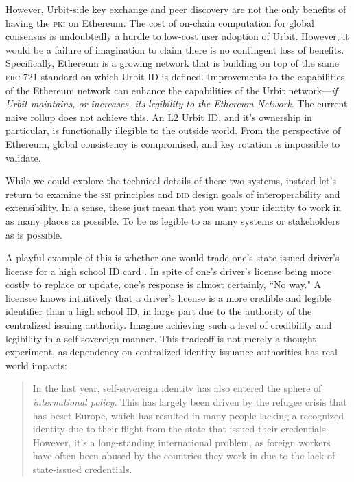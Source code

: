 \documentclass[twoside]{article}
\begin{document}
However, Urbit-side key exchange and peer discovery are not the only benefits of having the \textsc{pki} on Ethereum. The cost of on-chain computation for global consensus is undoubtedly a hurdle to low-cost user adoption of Urbit. However, it would be a failure of imagination to claim there is no contingent loss of benefits. Specifically, Ethereum is a growing network that is building on top of the same \textsc{erc}-721 standard on which Urbit ID is defined. Improvements to the capabilities of the Ethereum network can enhance the capabilities of the Urbit network—\emph{if Urbit maintains, or increases, its legibility to the Ethereum Network}.  The current naive rollup does not achieve this. An L2 Urbit ID, and it's ownership in particular, is functionally illegible to the outside world. From the perspective of Ethereum, global consistency is compromised, and key rotation is impossible to validate. 

While we could explore the technical details of these two systems, instead let's return to examine the \textsc{ssi} principles and \textsc{did} design goals of interoperability and extensibility. In a sense, these just mean that you want your identity to work in as many places as possible. To be as legible to as many systems or stakeholders as is po\textsc{ssi}ble. 

A playful example of this is whether one would trade one's state-issued driver's license for a high school ID card \citep{Sarlev2024}.  In spite of one's driver's license being more costly to replace or update, one's response is almost certainly, ``No way." A licensee knows intuitively that a driver's license is a more credible and legible identifier than a high school ID, in large part due to the authority of the centralized issuing authority. Imagine achieving such a level of credibility and legibility in a self-sovereign manner.  This tradeoff is not merely a thought experiment, as dependency on centralized identity issuance authorities has real world impacts:

\begin{quote}
In the last year, self-sovereign identity has also entered the sphere of \emph{international policy}. This has largely been driven by the refugee crisis that has beset Europe, which has resulted in many people lacking a recognized identity due to their flight from the state that issued their credentials. However, it’s a long-standing international problem, as foreign workers have often been abused by the countries they work in due to the lack of state-issued credentials.  \citep{Allen2016}
\end{quote}
\end{document}
